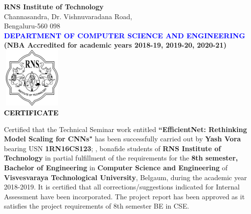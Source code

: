 \thispagestyle{empty}
\begin{center}

\textup{\large {\textcolor{darkbrown}{\bf RNS Institute of Technology}} \\ 
\normalsize{\textcolor{darkbrown}{Channasandra, Dr. Vishnuvaradana Road,\\ Bengaluru-560 098}}}\\[0.1in]
\textup{\normalsize {\textcolor{blue}{\bf DEPARTMENT OF COMPUTER SCIENCE AND ENGINEERING}}}\\ \textup{\small \bf \textcolor{darkbrown}{(NBA Accredited for academic years 2018-19, 2019-20, 2020-21)}} \\[0.1in]
\includegraphics[width=3cm, height=3cm]{../static/media/RNS_logo.png}\\[0.1in]
\textup{\large {\textcolor{black}{\textbf {CERTIFICATE}}}} \\[0.1in]
\end{center}

\begin{minipage}{14.8cm}
Certified that the Technical Seminar work entitled \textbf{``EfficientNet: Rethinking Model Scaling for CNNs"} has been successfully carried out by \textbf{Yash Vora} bearing USN \textbf{1RN16CS123};  , bonafide students of \textbf{RNS Institute of Technology} in partial fulfillment of the requirements for the \textbf{8th semester, Bachelor of Engineering} in \textbf{Computer Science and Engineering} of \textbf{Visvesvaraya Technological University}, Belgaum, during the academic year 2018-2019. It is certified that all corrections/suggestions indicated for Internal Assessment have been incorporated. The project report has been approved as it satisfies the project requirements of 8th semester BE in CSE.\\[0.4in]
\end{minipage}

